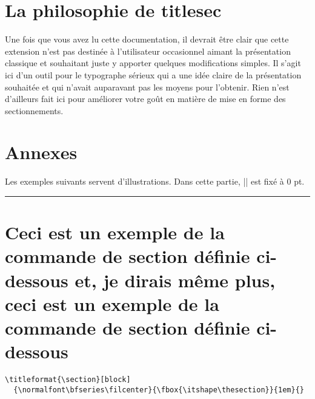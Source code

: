 \documentclass[a4paper]{ltxguide}
\newcommand{\examplesep}{%
  \begin{center}%
    \rule{4pt}{4pt}%
  \end{center}}
\begin{document}
\section{La philosophie de \textsf{titlesec}}

Une fois que vous avez lu cette documentation, il devrait être clair que cette
extension n'est pas destinée à l'utilisateur occasionnel aimant la
présentation classique et souhaitant juste y apporter quelques modifications
simples. Il s'agit ici d'un outil pour le typographe sérieux qui a une idée
claire de la présentation souhaitée et qui n'avait auparavant pas les moyens
pour l'obtenir. Rien n'est d'ailleurs fait ici pour améliorer votre goût en
matière de mise en forme des sectionnements.


\section{Annexes}

Les exemples suivants servent d'illustrations. Dans cette partie, |\parskip| est
fixé à 0 pt.

\begingroup

\setlength{\parskip}{0pt}

\examplesep

\titleformat{\section}[block]
  {\normalfont\bfseries\filcenter}{\fbox{\itshape\thesection}}{1em}{}

\section[Annexes]{Ceci est un exemple de la commande de section définie ci-dessous 
et, je dirais même plus, ceci est un exemple de la commande de section définie 
ci-dessous}

\begin{verbatim}
\titleformat{\section}[block]
  {\normalfont\bfseries\filcenter}{\fbox{\itshape\thesection}}{1em}{}
\end{verbatim}
\end{document}
